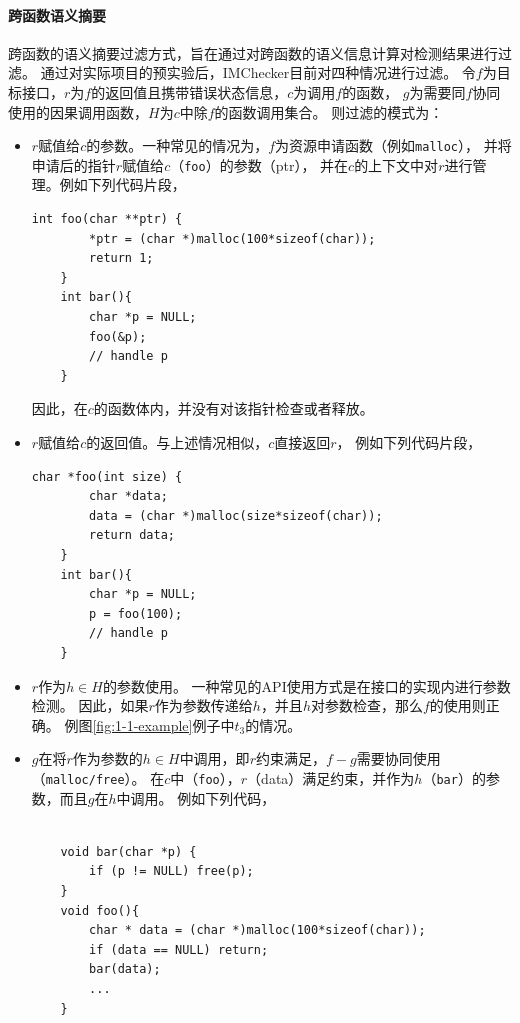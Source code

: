 \paragraph{跨函数语义摘要}
跨函数的语义摘要过滤方式，旨在通过对跨函数的语义信息计算对检测结果进行过滤。
通过对实际项目的预实验后，IMChecker目前对四种情况进行过滤。
令$f$为目标接口，$r$为$f$的返回值且携带错误状态信息，$c$为调用$f$的函数，
$g$为需要同$f$协同使用的因果调用函数，$H$为$c$中除$f$的函数调用集合。
则过滤的模式为：
\begin{itemize}
	\item $r$赋值给$c$的参数。一种常见的情况为，$f$为资源申请函数（例如\texttt{malloc}），
	并将申请后的指针$r$赋值给$c$（\texttt{foo}）的参数（ptr），
	并在$c$的上下文中对$r$进行管理。例如下列代码片段，
	\begin{lstlisting}[language={[ANSI]C},
	basicstyle=\linespread{0.7}\listingsfont,
	numbers=none,
	xleftmargin=.15\textwidth]
	int foo(char **ptr) {
		*ptr = (char *)malloc(100*sizeof(char));
		return 1;
	}
	int bar(){
		char *p = NULL;
		foo(&p);
		// handle p
	}
	\end{lstlisting}
	因此，在$c$的函数体内，并没有对该指针检查或者释放。
	\item $r$赋值给$c$的返回值。与上述情况相似，$c$直接返回$r$，
	例如下列代码片段，
		\begin{lstlisting}[language={[ANSI]C},
	basicstyle=\linespread{0.7}\listingsfont,
	numbers=none,
	xleftmargin=.15\textwidth]
	char *foo(int size) {
		char *data;
		data = (char *)malloc(size*sizeof(char));
		return data;	
	}
	int bar(){
		char *p = NULL;
		p = foo(100);
		// handle p
	}
	\end{lstlisting}
	\item $r$作为$h \in H$的参数使用。
	一种常见的API使用方式是在接口的实现内进行参数检测。
	因此，如果$r$作为参数传递给$h$，并且$h$对参数检查，那么$f$的使用则正确。
	例图\ref{fig:1-1-example}例子中$t_3$的情况。
	\item $g$在将$r$作为参数的$h \in H$中调用，即$r$约束满足，$f-g$需要协同使用（\texttt{malloc/free}）。
	在$c$中（\texttt{foo}），$r$（data）满足约束，并作为$h$（\texttt{bar}）的参数，而且$g$在$h$中调用。
	例如下列代码，
			\begin{lstlisting}[language={[ANSI]C},
	basicstyle=\linespread{0.7}\listingsfont,
	numbers=none,
	xleftmargin=.15\textwidth]
	
	void bar(char *p) {
		if (p != NULL) free(p);
	}
	void foo(){
		char * data = (char *)malloc(100*sizeof(char));
		if (data == NULL) return;
		bar(data);
	    ...
	}
	\end{lstlisting}
	
\end{itemize}

